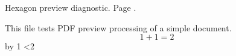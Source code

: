 \documentclass{article}
\begin{document}
\newcount\DiagnosticPage
{}
\loop
\noindent Hexagon preview diagnostic. Page \the\DiagnosticPage.
\par This file tests PDF preview processing of a simple document.
\[1+1=2\]
\clearpage
\advance\DiagnosticPage by 1
\ifnum\DiagnosticPage<2
\repeat
\end{document}
